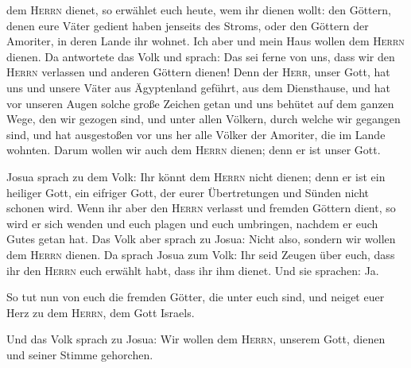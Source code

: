 dem \textsc{Herrn} dienet, so erwählet euch heute, wem ihr dienen wollt:
den Göttern, denen eure Väter gedient haben jenseits des Stroms, oder
den Göttern der Amoriter, in deren Lande ihr wohnet. Ich aber und mein
Haus wollen dem \textsc{Herrn} dienen.  Da antwortete das
Volk und sprach: Das sei ferne von uns, dass wir den \textsc{Herrn}
verlassen und anderen Göttern dienen!  Denn der
\textsc{Herr}, unser Gott, hat uns und unsere Väter aus Ägyptenland
geführt, aus dem Diensthause, und hat vor unseren Augen solche große
Zeichen getan und uns behütet auf dem ganzen Wege, den wir gezogen sind,
und unter allen Völkern, durch welche wir gegangen sind, 
und hat ausgestoßen vor uns her alle Völker der Amoriter, die im Lande
wohnten. Darum wollen wir auch dem \textsc{Herrn} dienen; denn er ist
unser Gott.

 Josua sprach zu dem Volk: Ihr könnt dem \textsc{Herrn}
nicht dienen; denn er ist ein heiliger Gott, ein eifriger Gott, der
eurer Übertretungen und Sünden nicht schonen wird.  Wenn
ihr aber den \textsc{Herrn} verlasst und fremden Göttern dient, so wird
er sich wenden und euch plagen und euch umbringen, nachdem er euch Gutes
getan hat.  Das Volk aber sprach zu Josua: Nicht also,
sondern wir wollen dem \textsc{Herrn} dienen.  Da sprach
Josua zum Volk: Ihr seid Zeugen über euch, dass ihr den \textsc{Herrn}
euch erwählt habt, dass ihr ihm dienet. Und sie sprachen: Ja.

 So tut nun von euch die fremden Götter, die unter euch
sind, und neiget euer Herz zu dem \textsc{Herrn}, dem Gott Israels.

 Und das Volk sprach zu Josua: Wir wollen dem
\textsc{Herrn}, unserem Gott, dienen und seiner Stimme gehorchen.

